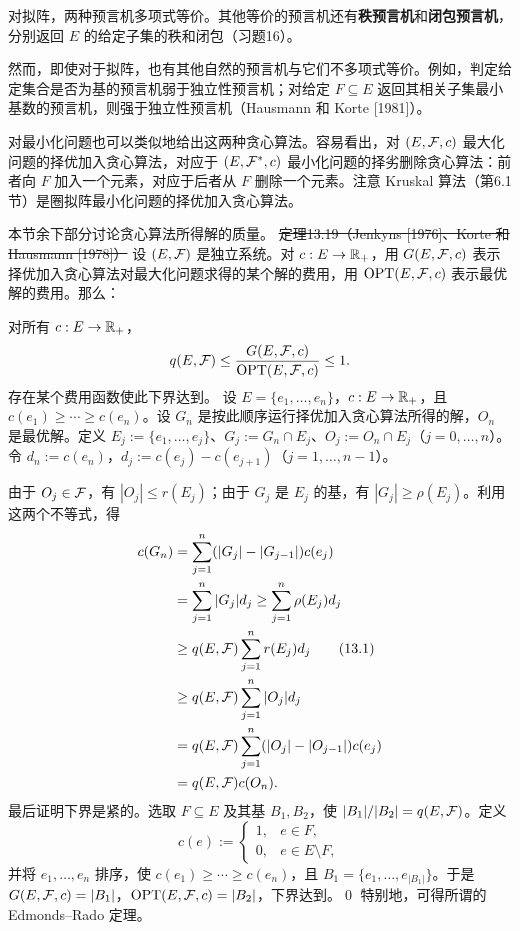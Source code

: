 对拟阵，两种预言机多项式等价。其他等价的预言机还有\textbf{秩预言机}和\textbf{闭包预言机}，分别返回 $E$ 的给定子集的秩和闭包（习题16）。

然而，即使对于拟阵，也有其他自然的预言机与它们不多项式等价。例如，判定给定集合是否为基的预言机弱于独立性预言机；对给定 $F\subseteq E$ 返回其相关子集最小基数的预言机，则强于独立性预言机（Hausmann 和 Korte [1981]）。

对最小化问题也可以类似地给出这两种贪心算法。容易看出，对 $(E,\mathcal F,c)$ 最大化问题的择优加入贪心算法，对应于 $(E,\mathcal F^*,c)$ 最小化问题的择劣删除贪心算法：前者向 $F$ 加入一个元素，对应于后者从 $F$ 删除一个元素。注意 Kruskal 算法（第6.1节）是圈拟阵最小化问题的择优加入贪心算法。

本节余下部分讨论贪心算法所得解的质量。
\st{定理13.19（Jenkyns [1976]、Korte 和 Hausmann [1978]）} 设 $(E,\mathcal F)$ 是独立系统。对 $c:E\to\mathbb R_+$，用 $G(E,\mathcal F,c)$ 表示择优加入贪心算法对最大化问题求得的某个解的费用，用 $\operatorname{OPT}(E,\mathcal F,c)$ 表示最优解的费用。那么：

对所有 $c:E\to\mathbb R_+$，
\[q(E,\mathcal F)\le\frac{G(E,\mathcal F,c)}{\operatorname{OPT}(E,\mathcal F,c)}\le1.\]
存在某个费用函数使此下界达到。
\pr 设 $E=\{e_1,\ldots,e_n\}$，$c:E\to\mathbb R_+$，且 $c(e_1)\ge\cdots\ge c(e_n)$。设 $G_n$ 是按此顺序运行择优加入贪心算法所得的解，$O_n$ 是最优解。定义 $E_j:=\{e_1,\ldots,e_j\}$、$G_j:=G_n\cap E_j$、$O_j:=O_n\cap E_j$（$j=0,\ldots,n$）。令 $d_n:=c(e_n)$，$d_j:=c(e_j)-c(e_{j+1})$（$j=1,\ldots,n-1$）。

由于 $O_j\in\mathcal F$，有 $|O_j|\le r(E_j)$；由于 $G_j$ 是 $E_j$ 的基，有 $|G_j|\ge\rho(E_j)$。利用这两个不等式，得
\begin{align}
c(G_n)&=\sum_{j=1}^n(|G_j|-|G_{j-1}|)c(e_j)\notag\\
&=\sum_{j=1}^n|G_j|d_j\ge\sum_{j=1}^n\rho(E_j)d_j\notag\\
&\ge q(E,\mathcal F)\sum_{j=1}^nr(E_j)d_j\tag{13.1}\\
&\ge q(E,\mathcal F)\sum_{j=1}^n|O_j|d_j\notag\\
&=q(E,\mathcal F)\sum_{j=1}^n(|O_j|-|O_{j-1}|)c(e_j)\notag\\
&=q(E,\mathcal F)c(O_n).\notag
\end{align}
最后证明下界是紧的。选取 $F\subseteq E$ 及其基 $B_1,B_2$，使 $|B_1|/|B_2|=q(E,\mathcal F)$。定义
\[c(e):=\begin{cases}1,&e\in F,\\0,&e\in E\setminus F,\end{cases}\]
并将 $e_1,\ldots,e_n$ 排序，使 $c(e_1)\ge\cdots\ge c(e_n)$，且 $B_1=\{e_1,\ldots,e_{|B_1|}\}$。于是 $G(E,\mathcal F,c)=|B_1|$，$\operatorname{OPT}(E,\mathcal F,c)=|B_2|$，下界达到。\qed
特别地，可得所谓的 Edmonds--Rado 定理。

